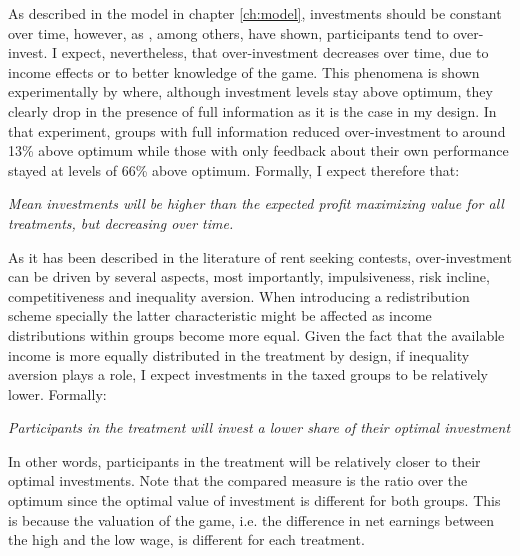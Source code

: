     As described in the model in chapter \ref{ch:model}, investments should be constant over time, however, as \cite{sheremeta2016}, among others, have shown, participants tend to over-invest. I expect, nevertheless, that over-investment decreases over time, due to income effects or to better knowledge of the game. This phenomena is shown experimentally by \cite{fallucchi2013} where, although investment levels stay above optimum, they clearly drop in the presence of full information  as it is the case in my design. In that experiment, groups with full information reduced over-investment to around 13\% above optimum while those with only feedback about their own performance stayed at levels of 66\% above optimum. Formally, I expect therefore that:
    
     \begin{hyp} \label{hyp:treat}\textit{Mean investments will be higher than the expected profit maximizing value for all treatments, but decreasing over time.}\end{hyp}
    \hfill\newline 
    As it has been described in the literature of rent seeking contests, over-investment can be driven by several aspects, most importantly, impulsiveness, risk incline, competitiveness and inequality aversion. When introducing a redistribution scheme specially the latter characteristic might be affected as income distributions within groups become more equal. Given the fact that the available income is more equally distributed in the treatment by design, if inequality aversion plays a role, I expect investments in the taxed groups to be relatively lower. Formally:
    
    \begin{hyp} \label{hyp:treat-overinvest}
    \textit{Participants in the treatment will invest a lower share of their optimal investment}
    \end{hyp}
    
    In other words, participants in the treatment will be relatively closer to their optimal investments. Note that the compared measure is the ratio over the optimum since the optimal value of investment is different for both groups. This is because the valuation of the game, i.e. the difference in net earnings between the high and the low wage, is different for each treatment.\\ 
    

